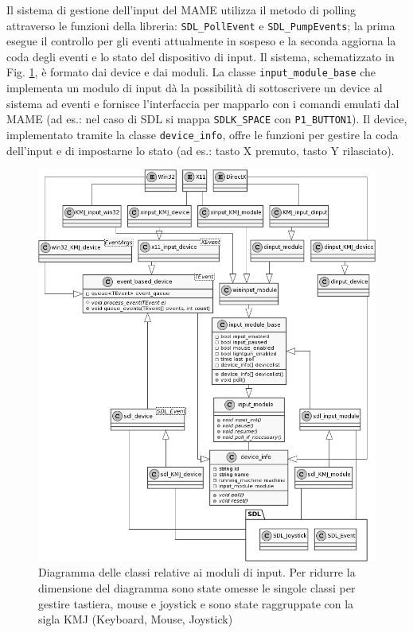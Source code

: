 


Il sistema di gestione dell'input del MAME utilizza il metodo di polling attraverso le funzioni della libreria: \verb|SDL_PollEvent| e \verb|SDL_PumpEvents|; la prima esegue il controllo per gli eventi attualmente in sospeso e la seconda aggiorna la coda degli eventi e lo stato del dispositivo di input. Il sistema, schematizzato in Fig. \ref{fig:class_input}, è formato dai device e dai moduli. La classe \verb|input_module_base| che implementa un modulo di input dà la possibilità di sottoscrivere un device al sistema ad eventi e fornisce l'interfaccia per mapparlo con i comandi emulati dal MAME (ad es.: nel caso di SDL si mappa \verb|SDLK_SPACE| con \verb|P1_BUTTON1|). Il device, implementato tramite la classe \verb|device_info|, offre le funzioni per gestire la coda dell'input e di impostarne lo stato (ad es.: tasto X premuto, tasto Y rilasciato).

\newpage
\begin{figure}[H]
	\includegraphics[width=\linewidth]{immagini/class_input}
	\caption{Diagramma delle classi relative ai moduli di input. Per ridurre la dimensione del diagramma sono state omesse le singole classi per gestire tastiera, mouse e joystick e sono state raggruppate con la sigla KMJ (Keyboard, Mouse, Joystick)}
	\label{fig:class_input}
\end{figure}

